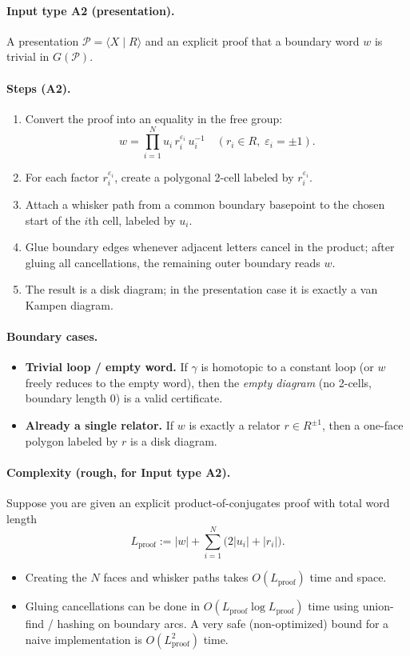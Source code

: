 \documentclass[11pt]{article}
\theoremstyle{definition}
\theoremstyle{plain}
\theoremstyle{remark}
\begin{document}
\paragraph{Input type A2 (presentation).}
A presentation $\mathcal P=\langle X\mid R\rangle$ and an explicit proof that a boundary word $w$ is trivial in $G(\mathcal P)$.

\paragraph{Steps (A2).}
\begin{enumerate}[leftmargin=2.2em]
\item Convert the proof into an equality in the free group:
\[
w=\prod_{i=1}^N u_i\, r_i^{\varepsilon_i}\,u_i^{-1}
\quad (r_i\in R,\;\varepsilon_i=\pm1).
\]
\item For each factor $r_i^{\varepsilon_i}$, create a polygonal 2-cell labeled by $r_i^{\varepsilon_i}$.
\item Attach a whisker path from a common boundary basepoint to the chosen start of the $i$th cell, labeled by $u_i$.
\item Glue boundary edges whenever adjacent letters cancel in the product; after gluing all cancellations, the remaining outer boundary reads $w$.
\item The result is a disk diagram; in the presentation case it is exactly a van Kampen diagram.
\end{enumerate}


\paragraph{Boundary cases.}
\begin{itemize}[leftmargin=2em]
\item \textbf{Trivial loop / empty word.} If $\gamma$ is homotopic to a constant loop (or $w$ freely reduces to the empty word), then the \emph{empty diagram} (no 2-cells, boundary length $0$) is a valid certificate.
\item \textbf{Already a single relator.} If $w$ is exactly a relator $r\in R^{\pm1}$, then a one-face polygon labeled by $r$ is a disk diagram.
\end{itemize}

\paragraph{Complexity (rough, for Input type A2).}\cite{vanKampen1933,lyndonschupp1977,tarjan1975}
Suppose you are given an explicit product-of-conjugates proof with total word length
\[
L_{\mathrm{proof}} := |w| + \sum_{i=1}^N \bigl(2|u_i|+|r_i|\bigr).
\]
\begin{itemize}[leftmargin=2em]
\item Creating the $N$ faces and whisker paths takes $O(L_{\mathrm{proof}})$ time and space.
\item Gluing cancellations can be done in $O(L_{\mathrm{proof}}\log L_{\mathrm{proof}})$ time using union-find / hashing on boundary arcs.
A very safe (non-optimized) bound for a naive implementation is $O(L_{\mathrm{proof}}^2)$ time.
\end{itemize}
\end{document}

